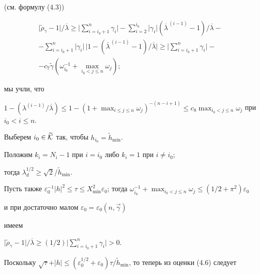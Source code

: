 (см. формулу (4.3))


\begin{gather*}


\vert\widetilde\rho_\gamma-1\vert/\overline\lambda\ge


\biggl\vert\sum_{i=i_0+1}^n\gamma_i\biggr\vert-\sum_{i=2}^{i_0}


\vert\gamma_i\vert(\overline\lambda^{\,(i-1)}-1)/\overline\lambda- \\


%


-\sum_{i=i_0+1}^n\vert\gamma_i\vert\,\vert 1-(\overline\lambda^{\,(i-1)}-1)/


\overline\lambda\vert \ge \biggr\vert\sum_{i=i_0+1}^n\gamma_i\biggl\vert- \\


%


-c_7 \widetilde\gamma(\omega_{i_0}^{-1}+


{\max}_{i_0<j\le n}\omega_j);


\end{gather*}


мы учли, что


$1-(\lambda^{(i-1)}/\overline\lambda)\le


1-(1+{\max}_{i\le j\le n}\omega_j)^{-(n-i+1)}\le


c_8{\max}_{i_0< j\le n}\omega_j$ при $i_0< i\le n$. 


Выберем $i_0\in\widetilde{\cal K}$ так, чтобы $h_{i_0}=\widetilde h_{\min}$.


Положим $k_i=N_i-1$ при $i=i_0$ либо $k_i=1$ при $i\ne i_0$;


тогда $\lambda_d^{1/2}\ge \sqrt 2/\widetilde h_{\min}$.


Пусть также $\varepsilon_0^{-1}\vert h\vert^2\le\tau\le


X_{\min}^2\varepsilon_0$; тогда $\omega_{i_0}^{-1}+


{\max}_{i_0<j\le n}\omega_j\le (1/2+\pi^2)


\varepsilon_0$


и при достаточно малом $\varepsilon_0=\varepsilon_0(n,\Vec\gamma)$ 


имеем 


$\vert\widetilde\rho_\gamma-1\vert/\overline\lambda


\ge (1/2)\vert\sum_{i=i_0+1}^n\gamma_i\vert>0$.


Поскольку $\sqrt\tau+\vert h\vert\le (\varepsilon_0^{1/2}+\varepsilon_0)


\tau/\widetilde h_{\min}$, то теперь из оценки (4.6) следует


